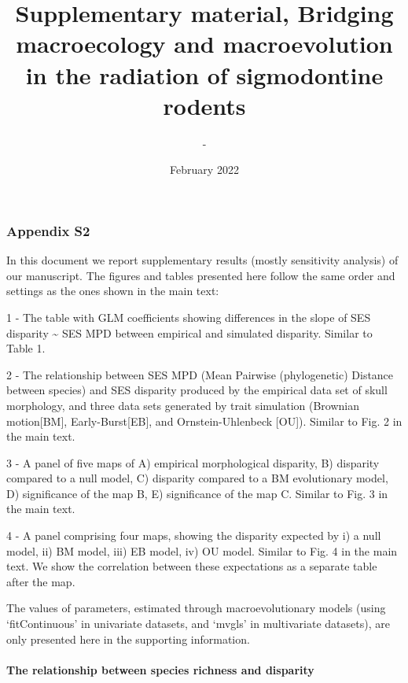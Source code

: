 \documentclass[
]{article}
\title{Supplementary material, Bridging macroecology and macroevolution
in the radiation of sigmodontine rodents}
\author{-}
\date{February 2022}
\begin{document}
\maketitle

\hypertarget{appendix-s2}{%
\subsubsection{Appendix S2}\label{appendix-s2}}

In this document we report supplementary results (mostly sensitivity
analysis) of our manuscript. The figures and tables presented here
follow the same order and settings as the ones shown in the main text:

1 - The table with GLM coefficients showing differences in the slope of
SES disparity \textasciitilde{} SES MPD between empirical and simulated
disparity. Similar to Table 1.

2 - The relationship between SES MPD (Mean Pairwise (phylogenetic)
Distance between species) and SES disparity produced by the empirical
data set of skull morphology, and three data sets generated by trait
simulation (Brownian motion{[}BM{]}, Early-Burst{[}EB{]}, and
Ornstein-Uhlenbeck {[}OU{]}). Similar to Fig. 2 in the main text.

3 - A panel of five maps of A) empirical morphological disparity, B)
disparity compared to a null model, C) disparity compared to a BM
evolutionary model, D) significance of the map B, E) significance of the
map C. Similar to Fig. 3 in the main text.

4 - A panel comprising four maps, showing the disparity expected by i) a
null model, ii) BM model, iii) EB model, iv) OU model. Similar to Fig. 4
in the main text. We show the correlation between these expectations as
a separate table after the map.

The values of parameters, estimated through macroevolutionary models
(using `fitContinuous' in univariate datasets, and `mvgls' in
multivariate datasets), are only presented here in the supporting
information.

\newpage

\hypertarget{the-relationship-between-species-richness-and-disparity}{%
\paragraph{The relationship between species richness and
disparity}\label{the-relationship-between-species-richness-and-disparity}}
\end{document}
